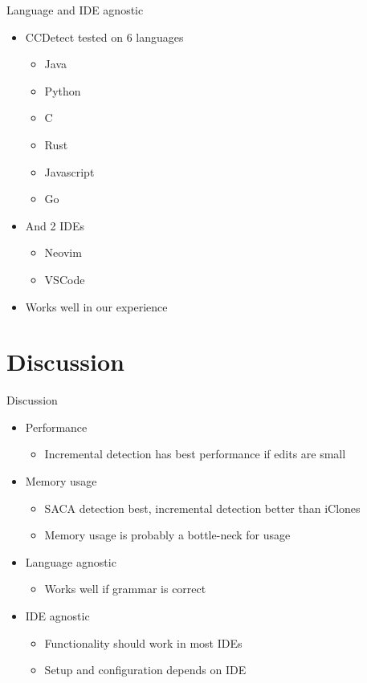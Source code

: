 \documentclass[aspectratio=1610, xcolor=table]{beamer}
\begin{document}
\begin{frame}{Language and IDE agnostic}
    \begin{itemize}
        \item CCDetect tested on 6 languages
            \begin{itemize}
                \item Java
                \item Python
                \item C
                \item Rust
                \item Javascript
                \item Go
            \end{itemize}
        \item And 2 IDEs
            \begin{itemize}
                \item Neovim
                \item VSCode
            \end{itemize}
        \item Works well in our experience
    \end{itemize}

\end{frame}
    
\section{Discussion}
\begin{frame}{Discussion}
    \begin{itemize}
        \item Performance
            \begin{itemize}
                \item Incremental detection has best performance if edits are small
            \end{itemize}
        \item Memory usage
            \begin{itemize}
                \item SACA detection best, incremental detection better than iClones
                \item Memory usage is probably a bottle-neck for usage
            \end{itemize}
        \item Language agnostic
            \begin{itemize}
                \item Works well if grammar is correct
            \end{itemize}
        \item IDE agnostic
            \begin{itemize}
                \item Functionality should work in most IDEs
                \item Setup and configuration depends on IDE
            \end{itemize}
    \end{itemize}
\end{frame}
\end{document}
